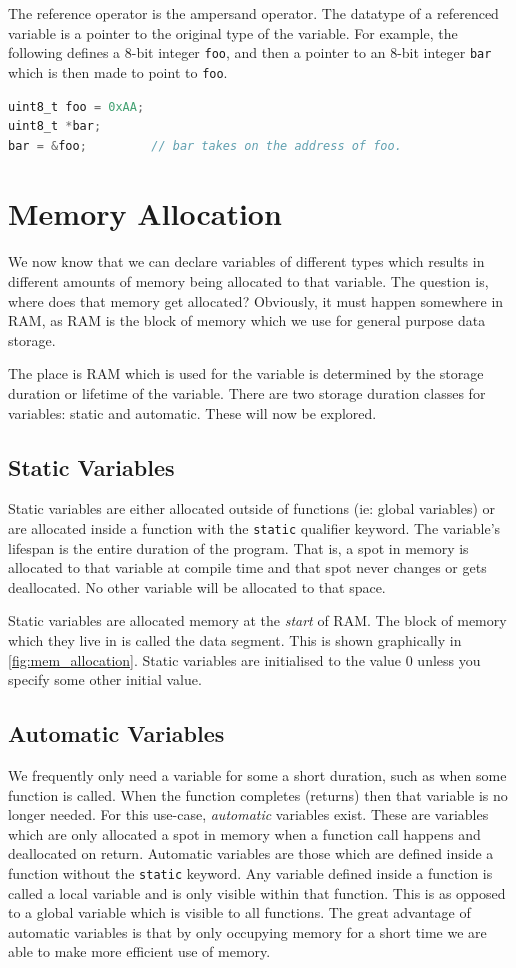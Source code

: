 The reference operator is the ampersand operator. The datatype of a referenced variable is a pointer to the original type of the variable.
For example, the following defines a 8-bit integer \texttt{foo}, and then a pointer to an 8-bit integer \texttt{bar} which is then made to point to \texttt{foo}.

\begin{lstlisting}[language=C]
uint8_t foo = 0xAA;
uint8_t *bar;
bar = &foo;         // bar takes on the address of foo.
\end{lstlisting}

\section{Memory Allocation}
We now know that we can declare variables of different types which results in different amounts of memory being allocated to that variable. 
The question is, where does that memory get allocated?
Obviously, it must happen somewhere in RAM, as RAM is the block of memory which we use for general purpose data storage. 

The place is RAM which is used for the variable is determined by the storage duration or lifetime of the variable. 
There are two storage duration classes for variables: static and automatic. These will now be explored. 

\subsection{Static Variables}
Static variables are either allocated outside of functions (ie: global variables) or are allocated inside a function with the \texttt{static} qualifier keyword. 
The variable's lifespan is the entire duration of the program. That is, a spot in memory is allocated to that variable at compile time and that spot never changes or gets deallocated. No other variable will be allocated to that space.

Static variables are allocated memory at the \emph{start} of RAM. The block of memory which they live in is called the data segment. This is shown graphically in \autoref{fig:mem_allocation}.
Static variables are initialised to the value 0 unless you specify some other initial value.

\subsection{Automatic Variables}
We frequently only need a variable for some a short duration, such as when some function is called. When the function completes (returns) then that variable is no longer needed.
For this use-case, \emph{automatic} variables exist. 
These are variables which are only allocated a spot in memory when a function call happens and deallocated on return. 
Automatic variables are those which are defined inside a function without the \texttt{static} keyword. Any variable defined inside a function is called a local variable and is only visible within that function. This is as opposed to a global variable which is visible to all functions. 
The great advantage of automatic variables is that by only occupying memory for a short time we are able to make more efficient use of memory. 

